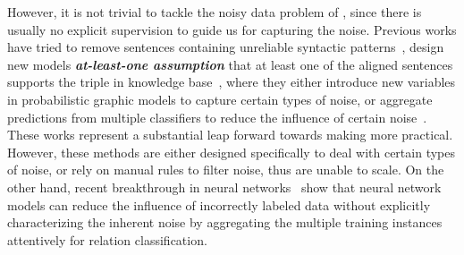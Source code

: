 However, it is not trivial to tackle the noisy data problem of \DS, since there is usually no explicit supervision to guide us for capturing the noise.
Previous works have tried to remove sentences containing unreliable syntactic patterns~\cite{takamatsu2012reducing}, design new models  \textbf{\textit{at-least-one assumption}}  that at least one of the aligned sentences supports the triple in knowledge base~\cite{riedel2010modeling}, where they either introduce new variables in probabilistic graphic models to capture certain types of noise, or aggregate predictions from multiple classifiers to reduce the influence of certain noise~\cite{hoffmann2011knowledge,surdeanu2012multi,ritter2013modeling,min2013distant}. These works represent a substantial leap forward towards making \DS more practical. However, these methods are either designed specifically to deal with certain types of noise, 
or rely on manual rules to filter noise, thus are unable to scale.
On the other hand, recent breakthrough in neural networks~\cite{lin2016neural} show that neural network models can reduce the influence of incorrectly labeled data without explicitly characterizing the inherent noise by aggregating the multiple training instances attentively for relation classification.



